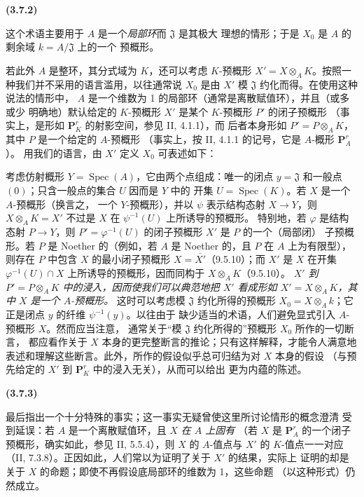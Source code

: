 \documentclass[UTF8,fontset=none,11pt,oneside,openany]{ctexbook}
\newenvironment{env}[1][]{%
  \par\medskip\noindent\textbf{(#1)}\ %
}{\par}
\newcommand{\oldpage}[2][]{%
  \hypertarget{ega-source-page-#1-#2}{}%
  \marginnote{\scriptsize\textbf{#1}~|~#2}\ignorespaces}
\let\EGAOriginalLabel\label
\renewcommand{\label}[1]{\phantomsection\EGAOriginalLabel{#1}}
\begin{document}
\begin{env}[3.7.2]
\label{I.3.7.2-fr}
这个术语主要用于 $A$ 是一个\emph{局部环}而 $\mathfrak{J}$ 是其极大
理想的情形；于是 $X_0$ 是 $A$ 的剩余域 $k=A/\mathfrak{J}$ 上的一个
预概形。

若此外 $A$ 是整环，其分式域为 $K$，还可以考虑 $K$-预概形
$X'=X\otimes_A K$。按照一种我们并不采用的语言滥用，以往通常说
$X_0$ 是由 $X'$ 模 $\mathfrak{J}$ 约化而得。在使用这种说法的情形中，
$A$ 是一个维数为 1 的局部环（通常是离散赋值环），并且（或多或少
明确地）默认给定的 $K$-预概形 $X'$ 是某个 $K$-预概形 $P'$ 的闭子预概形
（事实上，是形如 $\mathbf{P}_K^r$ 的射影空间，参见 II, 4.1.1），而
后者本身形如 $P'=P\otimes_A K$，其中 $P$ 是一个给定的 $A$-预概形
（事实上，按 II, 4.1.1 的记号，它是 $A$-概形 $\mathbf{P}_A^r$）。
用我们的语言，由 $X'$ 定义 $X_0$ 可表述如下：

考虑仿射概形 $Y=\operatorname{Spec}(A)$，它由两个点组成：唯一的闭点
\oldpage[I]{119}
$y=\mathfrak{J}$ 和一般点 $(0)$；只含一般点的集合 $U$ 因而是 $Y$ 中的
开集 $U=\operatorname{Spec}(K)$。若 $X$ 是一个 $A$-预概形（换言之，
一个 $Y$-预概形），并以 $\psi$ 表示结构态射 $X\to Y$，则
$X\otimes_A K=X'$ 不过是 $X$ 在 $\psi^{-1}(U)$ 上所诱导的预概形。
特别地，若 $\varphi$ 是结构态射 $P\to Y$，则
$P'=\varphi^{-1}(U)$ 的闭子预概形 $X'$ 是 $P$ 的一个（局部闭）
子预概形。若 $P$ 是 Noether 的（例如，若 $A$ 是 Noether 的，且 $P$
在 $A$ 上为有限型），则存在 $P$ 中包含 $X$ 的最小闭子预概形
$X=\overline{X'}$（9.5.10）；而 $X'$ 是 $X$ 在开集
$\varphi^{-1}(U)\cap X$ 上所诱导的预概形，因而同构于
$X\otimes_A K$（9.5.10）。
\emph{$X'$ 到 $P'=P\otimes_A K$ 中的浸入，因而使我们可以典范地把
$X'$ 看成形如 $X'=X\otimes_A K$，其中 $X$ 是一个 $A$-预概形。}
这时可以考虑模 $\mathfrak{J}$ 约化所得的预概形
$X_0=X\otimes_A k$；它正是闭点 $y$ 的纤维 $\psi^{-1}(y)$。以往由于
缺少适当的术语，人们避免显式引入 $A$-预概形 $X$。然而应当注意，
通常关于“模 $\mathfrak{J}$ 约化所得的”预概形 $X_0$ 所作的一切断言，
都应看作关于 $X$ 本身的更完整断言的推论；只有这样解释，才能令人满意地
表述和理解这些断言。此外，所作的假设似乎总可归结为对 $X$ 本身的假设
（与预先给定的 $X'$ 到 $\mathbf{P}_K^r$ 中的浸入无关），从而可以给出
更为内蕴的陈述。
\end{env}

\begin{env}[3.7.3]
\label{I.3.7.3-fr}
最后指出一个十分特殊的事实；这一事实无疑曾使这里所讨论情形的概念澄清
受到延误：若 $A$ 是一个离散赋值环，且 $X$ \emph{在 $A$ 上固有}
（若 $X$ 是 $\mathbf{P}_A^r$ 的一个闭子预概形，确实如此，参见
II, 5.5.4），则 $X$ 的 $A$-值点与 $X'$ 的 $K$-值点一一对应
（II, 7.3.8）。正因如此，人们常以为证明了关于 $X'$ 的结果，实际上
证明的却是关于 $X$ 的命题；即使不再假设底局部环的维数为 1，这些命题
（以这种形式）仍然成立。
\end{env}
\end{document}
